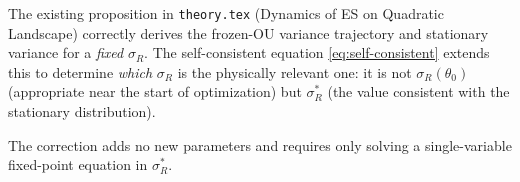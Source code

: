 \documentclass[american]{article}
\begin{document}
The existing proposition in \texttt{theory.tex} (Dynamics of ES on Quadratic Landscape)
correctly derives the frozen-OU variance trajectory and stationary variance for a
\emph{fixed} $\sigma_R$. The self-consistent equation \eqref{eq:self-consistent}
extends this to determine \emph{which} $\sigma_R$ is the physically relevant one:
it is not $\sigma_R(\theta_0)$ (appropriate near the start of optimization) but
$\sigma_R^*$ (the value consistent with the stationary distribution).

The correction adds no new parameters and requires only solving a single-variable
fixed-point equation in $\sigma_R^*$.
\end{document}
